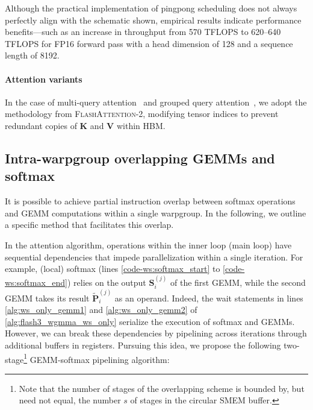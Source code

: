 Although the practical implementation of pingpong scheduling does not always perfectly align with the schematic shown, empirical results indicate performance benefits—such as an increase in throughput from 570 TFLOPS to 620–640 TFLOPS for FP16 forward pass with a head dimension of 128 and a sequence length of 8192.

\paragraph{Attention variants} In the case of multi-query attention~\citep{shazeer2019fast} and grouped query attention~\citep{ainslie2023gqa}, we adopt the methodology from \textsc{FlashAttention-2}, modifying tensor indices to prevent redundant copies of $\mathbf{K}$ and $\mathbf{V}$ within HBM.

\subsection{Intra-warpgroup overlapping GEMMs and softmax}

It is possible to achieve partial instruction overlap between softmax operations and GEMM computations within a single warpgroup. In the following, we outline a specific method that facilitates this overlap.

In the attention algorithm, operations within the inner loop (main loop) have sequential dependencies that impede parallelization within a single iteration. For example, (local) softmax (lines \ref{code-ws:softmax_start} to \ref{code-ws:softmax_end}) relies on the output $\mathbf{S}_i^{(j)}$ of the first GEMM, while the second GEMM takes its result $\widetilde{\mathbf{P}}_i^{(j)}$ as an operand. Indeed, the wait statements in lines \ref{alg:ws_only_gemm1} and \ref{alg:ws_only_gemm2} of \cref{alg:flash3_wgmma_ws_only} serialize the execution of softmax and GEMMs. However, we can break these dependencies by pipelining across iterations through additional buffers in registers. Pursuing this idea, we propose the following two-stage\footnote{Note that the number of stages of the overlapping scheme is bounded by, but need not equal, the number $s$ of stages in the circular SMEM buffer.} GEMM-softmax pipelining algorithm:

